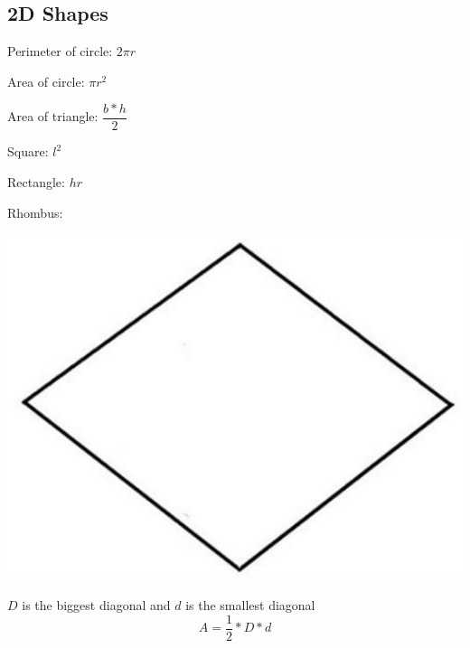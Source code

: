 \subsection{2D Shapes}


Perimeter of circle: $ 2 \pi r $

Area of circle: $ \pi r^2 $

Area of triangle: $ \dfrac{b * h}{2} $

Square: $ l^2 $

Rectangle: $ hr $

Rhombus:
\begin{center}
    \includegraphics[scale=.2, keepaspectratio]{./theoretical/assets/rhombus.png}
\end{center}
$D$ is the biggest diagonal and $d$ is the smallest diagonal
$$ A = \dfrac{1}{2} * D * d $$